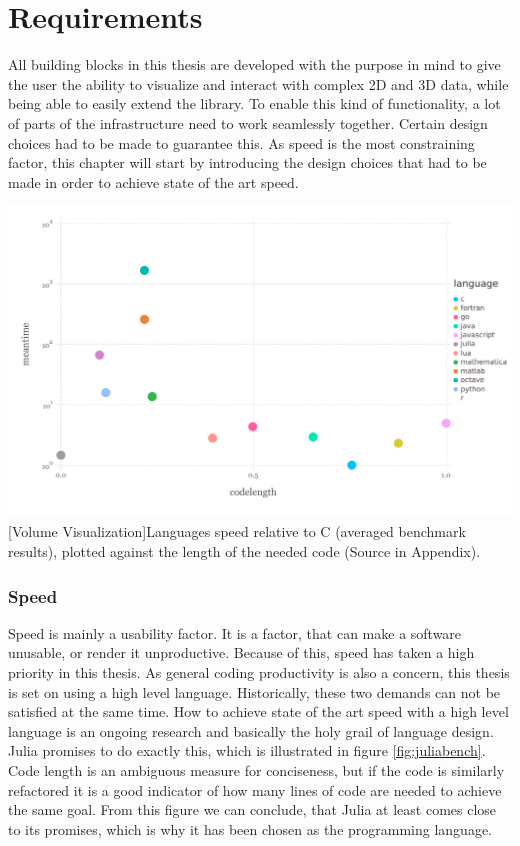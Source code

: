 \section{Requirements}

All building blocks in this thesis are developed with the purpose in mind to give the user the ability to visualize and interact with complex 2D and 3D data, while being able to easily extend the library.
To enable this kind of functionality, a lot of parts of the infrastructure need to work seamlessly together.
Certain design choices had to be made to guarantee this. As speed is the most constraining factor, this chapter will start by introducing the design choices that had to be made in order to achieve state of the art speed.

\vspace{1em}
\begin{minipage}{\linewidth}
    \centering
    \includegraphics[width=0.9\linewidth]{graphics/julia_bench.pdf}
    [Volume Visualization]{Languages speed relative to C (averaged benchmark results), plotted against the length of the needed code (Source in Appendix).}
    \label{fig:juliabench}
\end{minipage}


\subsubsection{Speed}
Speed is mainly a usability factor. It is a factor, that can make a software unusable, or render it unproductive. Because of this, speed has taken a high priority in this thesis. As general coding productivity is also a concern, this thesis is set on using a high level language.
Historically, these two demands can not be satisfied at the same time.
How to achieve state of the art speed with a high level language is an ongoing research and basically the holy grail of language design. 
Julia promises to do exactly this, which is illustrated in figure \ref{fig:juliabench}. 
Code length is an ambiguous measure for conciseness, but if the code is similarly refactored it is a good indicator of how many lines of code are needed to achieve the same goal.
From this figure we can conclude, that Julia at least comes close to its promises, which is why it has been chosen as the programming language.

